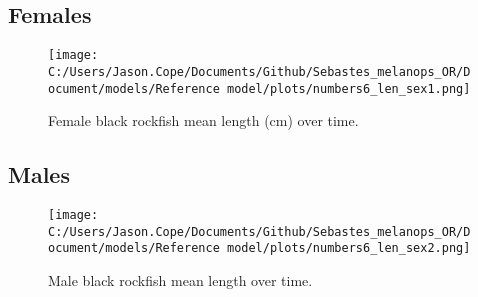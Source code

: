\documentclass[11pt,
  letterpaper,
]{article}
\begin{document}
\hypertarget{females-1}{%
\subsection{Females}\label{females-1}}

\begin{figure}
{\centering
\texttt{[image: C:/Users/Jason.Cope/Documents/Github/Sebastes\_melanops\_OR/Document/models/Reference model/plots/numbers6\_len\_sex1.png]}
}
\caption{Female black rockfish mean length (cm) over time.\label{fig:num_lts_females}}
\end{figure}

\clearpage

\hypertarget{males-1}{%
\subsection{Males}\label{males-1}}

\begin{figure}
{\centering
\texttt{[image: C:/Users/Jason.Cope/Documents/Github/Sebastes\_melanops\_OR/Document/models/Reference model/plots/numbers6\_len\_sex2.png]}
}
\caption{Male black rockfish mean length over time.\label{fig:num_lts_males}}
\end{figure}

\clearpage
\end{document}
